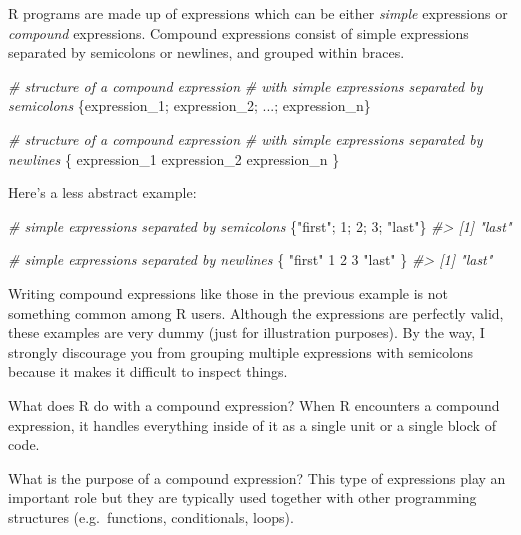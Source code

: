 \documentclass[
]{book}
\newenvironment{Shaded}{\begin{snugshade}}{\end{snugshade}}
\newcommand{\CommentTok}[1]{\textcolor[rgb]{0.56,0.35,0.01}{\textit{#1}}}
\newcommand{\DecValTok}[1]{\textcolor[rgb]{0.00,0.00,0.81}{#1}}
\newcommand{\NormalTok}[1]{#1}
\newcommand{\StringTok}[1]{\textcolor[rgb]{0.31,0.60,0.02}{#1}}
\begin{document}
R programs are made up of expressions which can be either \emph{simple} expressions
or \emph{compound} expressions. Compound expressions consist of simple expressions
separated by semicolons or newlines, and grouped within braces.

\begin{Shaded}
\begin{Highlighting}[]
\CommentTok{\# structure of a compound expression}
\CommentTok{\# with simple expressions separated by semicolons}
\NormalTok{\{expression\_1; expression\_2; ...; expression\_n\}}

\CommentTok{\# structure of a compound expression}
\CommentTok{\# with simple expressions separated by newlines}
\NormalTok{\{}
\NormalTok{  expression\_1}
\NormalTok{  expression\_2}
\NormalTok{  expression\_n}
\NormalTok{\}}
\end{Highlighting}
\end{Shaded}

Here's a less abstract example:

\begin{Shaded}
\begin{Highlighting}[]
\CommentTok{\# simple expressions separated by semicolons}
\NormalTok{\{}\StringTok{"first"}\NormalTok{; }\DecValTok{1}\NormalTok{; }\DecValTok{2}\NormalTok{; }\DecValTok{3}\NormalTok{; }\StringTok{"last"}\NormalTok{\}}
\CommentTok{\#\textgreater{} [1] "last"}

\CommentTok{\# simple expressions separated by newlines}
\NormalTok{\{}
  \StringTok{"first"}
  \DecValTok{1}
  \DecValTok{2}
  \DecValTok{3}
  \StringTok{"last"}
\NormalTok{\}}
\CommentTok{\#\textgreater{} [1] "last"}
\end{Highlighting}
\end{Shaded}

Writing compound expressions like those in the previous example is not
something common among R users. Although the expressions are perfectly valid,
these examples are very dummy (just for illustration purposes). By the way,
I strongly discourage you from grouping multiple expressions with semicolons
because it makes it difficult to inspect things.

What does R do with a compound expression? When R encounters a compound
expression, it handles everything inside of it as a single unit or a single
block of code.

What is the purpose of a compound expression? This type of expressions play an
important role but they are typically used together with other programming
structures (e.g.~functions, conditionals, loops).
\end{document}
